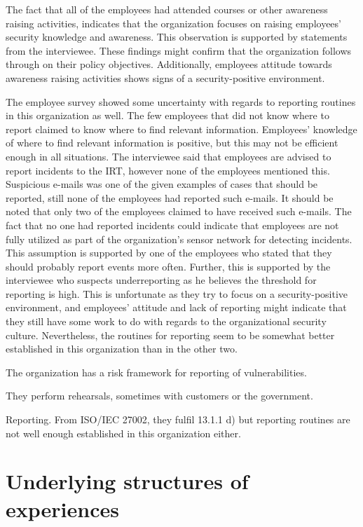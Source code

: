 The fact that all of the employees had attended courses or other awareness raising activities, indicates that the organization focuses on raising employees' security knowledge and awareness. This observation is supported by statements from the interviewee. These findings might confirm that the organization follows through on their policy objectives. Additionally, employees attitude towards awareness raising activities shows signs of a security-positive environment.  
 
The employee survey showed some uncertainty with regards to reporting routines in this organization as well. The few employees that did not know where to report claimed to know where to find relevant information. Employees' knowledge of where to find relevant information is positive, but this may not be efficient enough in all situations. The interviewee said that employees are advised to report incidents to the \ac{IRT}, however none of the employees mentioned this. Suspicious e-mails was one of the given examples of cases that should be reported, still none of the employees had reported such e-mails. It should be noted that only two of the employees claimed to have received such e-mails. The fact that no one had reported incidents could indicate that employees are not fully utilized as part of the organization's sensor network for detecting incidents. This assumption is supported by one of the employees who stated that they should probably report events more often. Further, this is supported by the interviewee who suspects underreporting as he believes the threshold for reporting is high. This is unfortunate as they try to focus on a security-positive environment, and employees' attitude and lack of reporting might indicate that they still have some work to do with regards to the organizational security culture. Nevertheless, the routines for reporting seem to be somewhat better established in this organization than in the other two. 

The organization has a risk framework for reporting of vulnerabilities.

They perform rehearsals, sometimes with customers or the government.


Reporting. From ISO/IEC 27002, they fulfil 13.1.1 d) but reporting routines are not well enough established in this organization either.


\section{Underlying structures of experiences}
